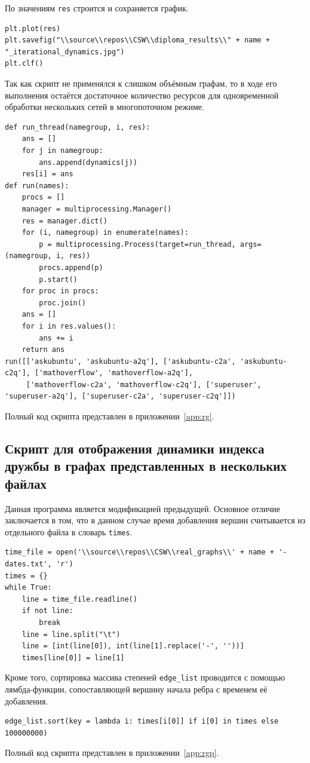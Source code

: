 \documentclass[bachelor, och, diploma]{SCWorks}
\begin{document}
По значениям \texttt{res} строится и сохраняется график.
\begin{verbatim}
plt.plot(res)
plt.savefig("\\source\\repos\\CSW\\diploma_results\\" + name + "_iterational_dynamics.jpg")
plt.clf()
\end{verbatim}
Так как скрипт не применялся к слишком объёмным графам, то в ходе его выполнения остаётся достаточное количество ресурсов для одновременной обработки нескольких сетей в многопоточном режиме.
\begin{verbatim}
def run_thread(namegroup, i, res):
    ans = []
    for j in namegroup:
        ans.append(dynamics(j))
    res[i] = ans
def run(names):
    procs = []
    manager = multiprocessing.Manager()
    res = manager.dict()
    for (i, namegroup) in enumerate(names):
        p = multiprocessing.Process(target=run_thread, args=(namegroup, i, res))
        procs.append(p)
        p.start()
    for proc in procs:
        proc.join()
    ans = []
    for i in res.values():
        ans += i
    return ans
run([['askubuntu', 'askubuntu-a2q'], ['askubuntu-c2a', 'askubuntu-c2q'], ['mathoverflow', 'mathoverflow-a2q'], 
     ['mathoverflow-c2a', 'mathoverflow-c2q'], ['superuser', 'superuser-a2q'], ['superuser-c2a', 'superuser-c2q']])
\end{verbatim}
Полный код скрипта представлен в приложении~\ref{app:rg}.
\subsection{Скрипт для отображения динамики индекса дружбы в графах представленных в нескольких файлах}
Данная программа является модификацией предыдущей. Основное отличие заключается в том, что в данном случае время добавления вершин считывается из отдельного файла в словарь \texttt{times}.
\begin{verbatim}
time_file = open('\\source\\repos\\CSW\\real_graphs\\' + name + '-dates.txt', 'r')
times = {}
while True:
    line = time_file.readline()
    if not line:
        break
    line = line.split("\t")
    line = [int(line[0]), int(line[1].replace('-', ''))]
    times[line[0]] = line[1]
\end{verbatim}
Кроме того, сортировка массива степеней \texttt{edge_list} проводится с помощью лямбда-функции, сопоставляющей вершину начала ребра с временем её добавления.
\begin{verbatim}
edge_list.sort(key = lambda i: times[i[0]] if i[0] in times else 100000000)
\end{verbatim}
Полный код скрипта представлен в приложении~\ref{app:rgp}.
\end{document}
